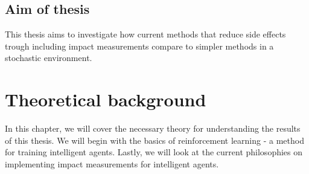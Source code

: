 \documentclass[12pt,A4]{report}
\newcommand{\autobaj}{}
\theoremstyle{definition}
\begin{document}





\section{Aim of thesis}
This thesis aims to investigate how current methods that reduce side effects trough including impact measurements compare to simpler methods in a stochastic environment.


 


\chapter{Theoretical background}
In this chapter, we will cover the necessary theory for understanding the results of this thesis. We will begin with the basics of reinforcement learning - a method for training intelligent agents. Lastly, we will look at the current philosophies on implementing impact measurements for intelligent agents. 
\end{document}
